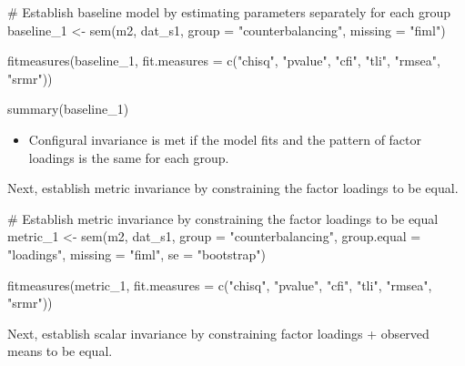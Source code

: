 \documentclass[
  letterpaper,
  DIV=11,
  numbers=noendperiod]{scrreprt}
\newenvironment{Shaded}{\begin{snugshade}}{\end{snugshade}}
\newcommand{\AttributeTok}[1]{\textcolor[rgb]{0.40,0.45,0.13}{#1}}
\newcommand{\CommentTok}[1]{\textcolor[rgb]{0.37,0.37,0.37}{#1}}
\newcommand{\FunctionTok}[1]{\textcolor[rgb]{0.28,0.35,0.67}{#1}}
\newcommand{\NormalTok}[1]{\textcolor[rgb]{0.00,0.23,0.31}{#1}}
\newcommand{\OtherTok}[1]{\textcolor[rgb]{0.00,0.23,0.31}{#1}}
\newcommand{\StringTok}[1]{\textcolor[rgb]{0.13,0.47,0.30}{#1}}
\providecommand{\tightlist}{%
  \setlength{\itemsep}{0pt}\setlength{\parskip}{0pt}}\usepackage{longtable,booktabs,array}
\begin{document}
\begin{Shaded}
\begin{Highlighting}[]
\CommentTok{\# Establish baseline model by estimating parameters separately for each group}
\NormalTok{baseline\_1 }\OtherTok{\textless{}{-}} \FunctionTok{sem}\NormalTok{(m2, dat\_s1, }\AttributeTok{group =} \StringTok{"counterbalancing"}\NormalTok{, }\AttributeTok{missing =} \StringTok{"fiml"}\NormalTok{) }

\FunctionTok{fitmeasures}\NormalTok{(baseline\_1, }\AttributeTok{fit.measures =} \FunctionTok{c}\NormalTok{(}\StringTok{"chisq"}\NormalTok{, }\StringTok{"pvalue"}\NormalTok{, }\StringTok{"cfi"}\NormalTok{, }\StringTok{"tli"}\NormalTok{, }\StringTok{"rmsea"}\NormalTok{, }\StringTok{"srmr"}\NormalTok{))}

\FunctionTok{summary}\NormalTok{(baseline\_1)}
\end{Highlighting}
\end{Shaded}

\begin{itemize}
\tightlist
\item
  Configural invariance is met if the model fits and the pattern of
  factor loadings is the same for each group.
\end{itemize}

Next, establish metric invariance by constraining the factor loadings to
be equal.

\begin{Shaded}
\begin{Highlighting}[]
\CommentTok{\# Establish metric invariance by constraining the factor loadings to be equal}
\NormalTok{metric\_1 }\OtherTok{\textless{}{-}} \FunctionTok{sem}\NormalTok{(m2, dat\_s1, }\AttributeTok{group =} \StringTok{"counterbalancing"}\NormalTok{, }\AttributeTok{group.equal =} \StringTok{"loadings"}\NormalTok{, }\AttributeTok{missing =} \StringTok{"fiml"}\NormalTok{, }\AttributeTok{se =} \StringTok{"bootstrap"}\NormalTok{)}

\FunctionTok{fitmeasures}\NormalTok{(metric\_1, }\AttributeTok{fit.measures =} \FunctionTok{c}\NormalTok{(}\StringTok{"chisq"}\NormalTok{, }\StringTok{"pvalue"}\NormalTok{, }\StringTok{"cfi"}\NormalTok{, }\StringTok{"tli"}\NormalTok{, }\StringTok{"rmsea"}\NormalTok{, }\StringTok{"srmr"}\NormalTok{))}
\end{Highlighting}
\end{Shaded}

Next, establish scalar invariance by constraining factor loadings +
observed means to be equal.
\end{document}
